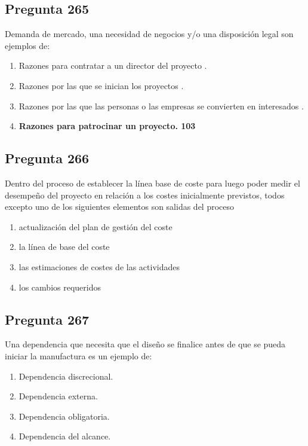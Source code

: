 \documentclass[11pt,a4paper]{article}
\begin{document}
\subsection*{Pregunta 265}
Demanda de mercado, una necesidad de negocios y/o una disposición legal son ejemplos de:

\begin{enumerate}[label=\alph*)]
  \item Razones para contratar a un director del proyecto .
  \item Razones por las que se inician los proyectos .
  \item Razones por las que las personas o las empresas se convierten en interesados .
  \item \textbf{Razones para patrocinar un proyecto. 103}
\end{enumerate}

\subsection*{Pregunta 266}
Dentro del proceso de establecer la línea base de coste para luego poder medir el desempeño del proyecto en relación a los costes inicialmente previstos, todos excepto uno de los siguientes elementos son salidas del proceso

\begin{enumerate}[label=\alph*)]
  \item actualización del plan de gestión del coste
  \item la línea de base del coste
  \item las estimaciones de costes de las actividades
  \item los cambios requeridos
\end{enumerate}

\subsection*{Pregunta 267}
Una dependencia que necesita que el diseño se finalice antes de que se pueda iniciar la manufactura es un ejemplo de:

\begin{enumerate}[label=\alph*)]
  \item Dependencia discrecional.
  \item Dependencia externa.
  \item Dependencia obligatoria.
  \item Dependencia del alcance.
\end{enumerate}
\end{document}
